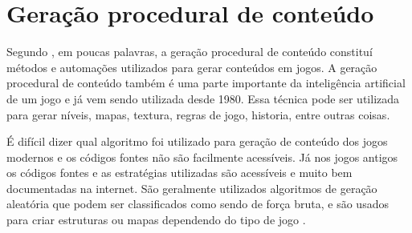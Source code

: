 \section{Geração procedural de conteúdo}

Segundo , em poucas palavras, a geração procedural de conteúdo constituí métodos e automações utilizados para gerar conteúdos em jogos. A geração procedural de conteúdo também é uma parte importante da inteligência artificial de um jogo e já vem sendo utilizada desde 1980.
Essa técnica pode ser utilizada para gerar níveis, mapas, textura, regras de jogo, historia, entre outras coisas.

É difícil dizer qual algoritmo foi utilizado para geração de conteúdo dos jogos modernos e os códigos fontes não são facilmente acessíveis. Já nos jogos antigos os códigos fontes e as estratégias utilizadas são acessíveis e muito bem documentadas na internet. São geralmente utilizados algoritmos de geração aleatória que podem ser classificados como sendo de força bruta, e são usados para criar estruturas ou mapas dependendo do tipo de jogo \cite{dormans2010adventures}.
